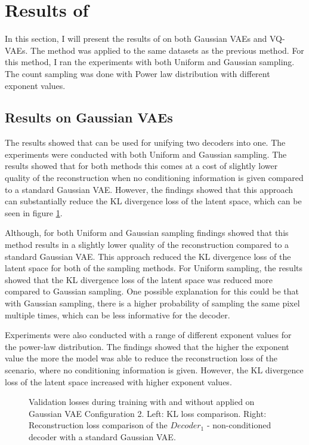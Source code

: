 \section{Results of }

In this section, I will present the results of  on both Gaussian VAEs and VQ-VAEs. The method was applied to the same datasets as the previous method. For this method, I ran the experiments with both Uniform and Gaussian sampling. The count sampling was done with Power law distribution with different exponent values.

\subsection{Results on Gaussian VAEs}

The results showed that  can be used for unifying two decoders into one. The experiments were conducted with both Uniform and Gaussian sampling. The results showed that for both methods this comes at a cost of slightly lower quality of the reconstruction when no conditioning information is given compared to a standard Gaussian VAE. However, the findings showed that this approach can substantially reduce the KL divergence loss of the latent space, which can be seen in figure \ref{fig:results_method2_gaussian_vae}.

Although, for both Uniform and Gaussian sampling findings showed that this method results in a slightly lower quality of the reconstruction compared to a standard Gaussian VAE. This approach reduced the KL divergence loss of the latent space for both of the sampling methods. For Uniform sampling, the results showed that the KL divergence loss of the latent space was reduced more compared to Gaussian sampling. One possible explanation for this could be that with Gaussian sampling, there is a higher probability of sampling the same pixel multiple times, which can be less informative for the decoder.

Experiments were also conducted with a range of different exponent values for the power-law distribution. The findings showed that the higher the exponent value the more the model was able to reduce the reconstruction loss of the scenario, where no conditioning information is given. However, the KL divergence loss of the latent space increased with higher exponent values.

\begin{figure}[H]
    \centering
    \scalebox{0.48}{}
    \scalebox{0.48}{}
    \caption[Validation loss during training with  applied on Gaussian VAE.]
    {
        Validation losses during training with and without  applied on Gaussian VAE Configuration 2.
        Left: KL loss comparison. Right: Reconstruction loss comparison of the $Decoder_1$ - non-conditioned decoder with a standard Gaussian VAE.
    }
    \label{fig:results_method2_gaussian_vae}
\end{figure}

